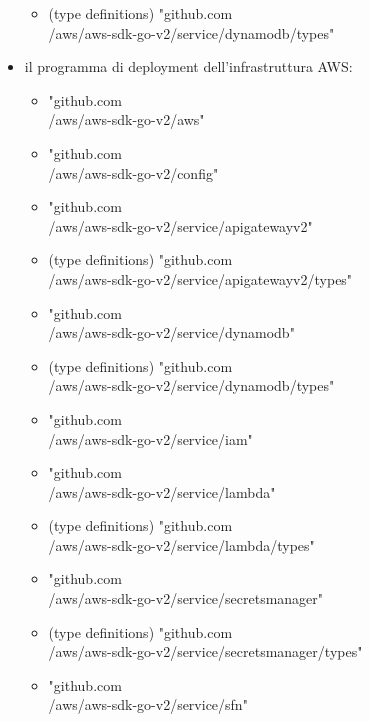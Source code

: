 \documentclass[
    sigconf, 
    screen=false, 
    acmthm=false, 
    nonacm
]{acmart}
\begin{document}
\begin{itemize}
\begin{itemize}
        \item (type definitions) "github.com\\/aws/aws-sdk-go-v2/service/dynamodb/types" \cite{awssdkgo}
    \end{itemize}
    \item il programma di deployment dell'infrastruttura AWS:
    \begin{itemize}
        \item "github.com\\/aws/aws-sdk-go-v2/aws" \cite{awssdkgo}
        \item "github.com\\/aws/aws-sdk-go-v2/config" \cite{awssdkgo}
        \item "github.com\\/aws/aws-sdk-go-v2/service/apigatewayv2" \cite{awssdkgo}
        \item (type definitions) "github.com\\/aws/aws-sdk-go-v2/service/apigatewayv2/types" \cite{awssdkgo}
        \item "github.com\\/aws/aws-sdk-go-v2/service/dynamodb" \cite{awssdkgo}
        \item (type definitions) "github.com\\/aws/aws-sdk-go-v2/service/dynamodb/types" \cite{awssdkgo}
        \item "github.com\\/aws/aws-sdk-go-v2/service/iam" \cite{awssdkgo}
        \item "github.com\\/aws/aws-sdk-go-v2/service/lambda" \cite{awssdkgo}
        \item (type definitions) "github.com\\/aws/aws-sdk-go-v2/service/lambda/types" \cite{awssdkgo}
        \item "github.com\\/aws/aws-sdk-go-v2/service/secretsmanager" \cite{awssdkgo}
        \item (type definitions) "github.com\\/aws/aws-sdk-go-v2/service/secretsmanager/types" \\ \cite{awssdkgo}
        \item "github.com\\/aws/aws-sdk-go-v2/service/sfn" \cite{awssdkgo}
    \end{itemize}
\end{itemize}



\end{document}
